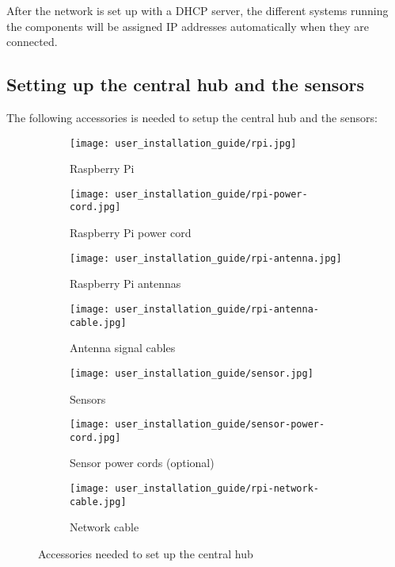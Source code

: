 \documentclass[../document.tex]{subfiles}
\begin{document}
After the network is set up with a \gls{DHCP} server, the different systems running the components will be assigned IP addresses automatically when they are connected.



\subsection{Setting up the central hub and the sensors}
The following accessories is needed to setup the central hub and the sensors:
\newcommand{\Imwidth}{0.40}
\begin{figure}[H]
	\centering
	\begin{subfigure}[h]{\Imwidth\textwidth}
		\texttt{[image: user\_installation\_guide/rpi.jpg]}
		\caption{\gls{Raspberry Pi}}	
	\end{subfigure}
	\quad
	\begin{subfigure}[h]{\Imwidth\textwidth}
		\texttt{[image: user\_installation\_guide/rpi-power-cord.jpg]}
		\caption{\gls{Raspberry Pi} power cord}	
	\end{subfigure}
	\quad
	\begin{subfigure}[h]{\Imwidth\textwidth}
		\texttt{[image: user\_installation\_guide/rpi-antenna.jpg]}
		\caption{\gls{Raspberry Pi} antennas}	
	\end{subfigure}
	\quad
	\begin{subfigure}[h]{\Imwidth\textwidth}
		\texttt{[image: user\_installation\_guide/rpi-antenna-cable.jpg]}
		\caption{Antenna signal cables}	
	\end{subfigure}
	\quad
	\begin{subfigure}[h]{\Imwidth\textwidth}
		\texttt{[image: user\_installation\_guide/sensor.jpg]}
		\caption{Sensors}	
	\end{subfigure}
	\quad
	\begin{subfigure}[h]{\Imwidth\textwidth}
		\texttt{[image: user\_installation\_guide/sensor-power-cord.jpg]}
		\caption{Sensor power cords (optional)}	
	\end{subfigure}
	\quad
	\begin{subfigure}[h]{\Imwidth\textwidth}
		\texttt{[image: user\_installation\_guide/rpi-network-cable.jpg]}
		\caption{Network cable}	
	\end{subfigure}
	\caption{Accessories needed to set up the central hub}
\end{figure}
\end{document}
